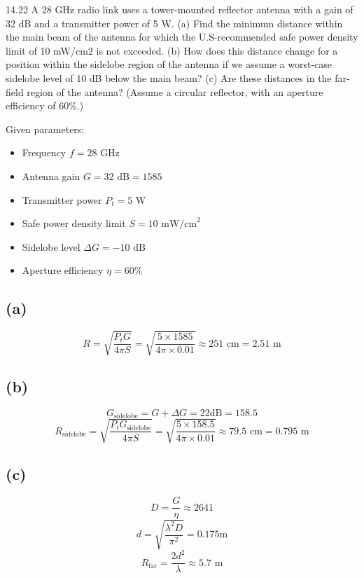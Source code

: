 \documentclass[cn,12pt]{homework}
\begin{document}
14.22 A 28 GHz radio link uses a tower-mounted reflector antenna with a gain of 32 dB and a transmitter power of 5 W. (a) Find the minimum distance within the main beam of the antenna for which
the U.S-recommended safe power density limit of 10 mW/cm2 is not exceeded. (b) How does this
distance change for a position within the sidelobe region of the antenna if we assume a worst-case
sidelobe level of 10 dB below the main beam? (c) Are these distances in the far-field region of the
antenna? (Assume a circular reflector, with an aperture efficiency of 60\%.)
\begin{solution}
  Given parameters:
\begin{itemize}
    \item Frequency \( f = 28 \text{ GHz} \)
    \item Antenna gain \( G = 32 \text{ dB} =1585 \)
    \item Transmitter power \( P_t = 5 \text{ W} \)
    \item Safe power density limit \( S = 10 \text{ mW/cm}^2 \)
    \item Sidelobe level \( \Delta G = -10 \text{ dB} \)
    \item Aperture efficiency \( \eta = 60\% \)
\end{itemize}

\subsection*{(a)}
\[ R = \sqrt{\frac{P_t G}{4\pi S}} = \sqrt{\frac{5 \times 1585}{4\pi \times 0.01}} \approx 251 \text{ cm} = 2.51 \text{ m} \]

\subsection*{(b)}
\[G_{\text{sidelobe}}= G + \Delta G = 22 \text{dB} = 158.5 \]
\[ R_{\text{sidelobe}} = \sqrt{\frac{P_t G_{\text{sidelobe}}}{4\pi S}} = \sqrt{\frac{5  \times 158.5}{4\pi \times 0.01}} \approx 79.5 \text{ cm} = 0.795 \text{ m} \]

\subsection*{(c)}
\[ D = \frac{G}{\eta} \approx 2641 \]
\[ d = \sqrt{\frac{\lambda^2 D}{\pi^2}} =0.175\text{m}\] 
\[ R_{\text{far}} = \frac{2 d^2}{\lambda} \approx 5.7 \text{ m} \]
\end{solution}
\newpage
\end{document}
